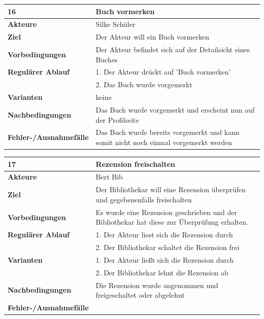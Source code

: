 \documentclass[fontsize=12pt,paper=a4,twoside]{scrartcl}
\begin{document}
\begin{table}[htbp]
\label{16}
\begin{tabular}{|l|p{10cm}|}
\hline 
\textbf{16} & \textbf{Buch vormerken} \\ \hline
\textbf{Akteure} & Silke Schüler\\ \hline
\textbf{Ziel} & Der Akteur will ein Buch vormerken \\ \hline
\textbf{Vorbedingungen} & Der Akteur befindet sich auf der Detailsicht eines Buches \\ \hline
\textbf{Regulärer Ablauf} & 
1. Der Akteur drückt auf 'Buch vormerken' \\
&2. Das Buch wurde vorgemerkt\\
\hline
\textbf{Varianten} & 
keine \\ \hline
\textbf{Nachbedingungen} & Das Buch wurde vorgemerkt und erscheint nun auf der Profilseite\\ \hline
\textbf{Fehler-/Ausnahmefälle} & Das Buch wurde bereits vorgemerkt und kann somit nicht noch einmal 
vorgemerkt werden\\
\hline
\end{tabular}
\end{table}

\begin{table}[htbp]
\label{17}
\begin{tabular}{|l|p{10cm}|}
\hline 
\textbf{17} & \textbf{Rezension freischalten} \\ \hline
\textbf{Akteure} & Bert Bib\\ \hline
\textbf{Ziel} & Der Bibliothekar will eine Rezension überprüfen und gegebenenfalls freischalten \\ \hline
\textbf{Vorbedingungen} & Es wurde eine Rezension geschrieben und der Bibliothekar hat diese zur 
Überprüfung erhalten. \\ \hline
\textbf{Regulärer Ablauf} & 
1. Der Akteur liest sich die Rezension durch \\
&2. Der Bibliothekar schaltet die Rezension frei\\
\hline
\textbf{Varianten} & 
1. Der Akteur ließt sich die Rezension durch \\
&2. Der Bibliothekar lehnt die Rezension ab \\ \hline
\textbf{Nachbedingungen} & Die Rezension wurde angenommen und freigeschaltet oder abgelehnt\\ 
\hline
\textbf{Fehler-/Ausnahmefälle} & \\
\hline
\end{tabular}
\end{table}
\end{document}
